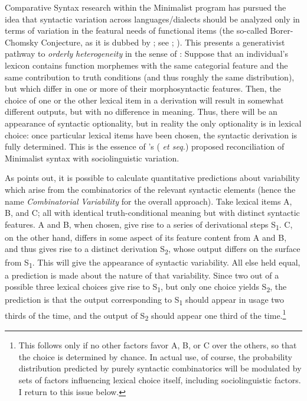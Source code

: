 \documentclass[output=paper]{langsci/langscibook}
\begin{document}
Comparative Syntax research within the Minimalist program has pursued the idea
that syntactic variation across languages/dialects should be analyzed only in
terms of variation in the featural needs of functional items (the so-called
Borer-Chomsky Conjecture, as it is dubbed by \citealt{Baker2008b}; see
\citealt{Borer1984}; \citealt{Chomsky1995}).  This presents a generativist
pathway to \emph{orderly} \emph{heterogeneity} in the sense of
\textcite{WeiLabHer1968}: Suppose that an individual’s lexicon contains
function morphemes with the same categorial feature and the same contribution
to truth conditions (and thus roughly the same distribution), but which differ
in one or more of their morphosyntactic features.  Then, the choice of one or
the other lexical item in a derivation will result in somewhat different
outputs, but with no difference in meaning.  Thus, there will be an appearance
of syntactic optionality, but in reality the only optionality is in lexical
choice: once particular lexical items have been chosen, the syntactic
derivation is fully determined.  This is the essence of
\citeauthor{Adger2006}'s (\citeyear{Adger2006} \emph{et seq.}) proposed
reconciliation of Minimalist syntax with sociolinguistic
variation.%

As \citet{Adger2006} points out, it is possible to calculate quantitative
predictions about variability which arise from the combinatorics of the
relevant syntactic elements (hence the name \emph{Combinatorial}
\emph{Variability} for the overall approach).  Take lexical items A, B, and
C; all with identical truth-conditional meaning but with distinct syntactic
features.   A and B, when chosen, give rise to a series of derivational steps
S\textsubscript{1}.  C, on the other hand, differs in some aspect of its
feature content from A and B, and thus gives rise to a distinct derivation
S\textsubscript{2}, whose output differs on the surface from
S\textsubscript{1}.  This will give the appearance of syntactic variability.
All else held equal, a prediction is made about the nature of that variability.
Since two out of a possible three lexical choices give rise to
S\textsubscript{1}, but only one choice yields S\textsubscript{2}, the
prediction is that the output corresponding to S\textsubscript{1} should appear
in usage two thirds of the time, and the output of S\textsubscript{2} should
appear one third of the time.\footnote{This follows only if no other factors
favor A, B, or C over the others, so that the choice is determined by chance.
In actual use, of course, the probability distribution predicted by purely
syntactic combinatorics will be modulated by sets of factors influencing
lexical choice itself, including sociolinguistic factors.  I return to this
issue below.}
\end{document}
